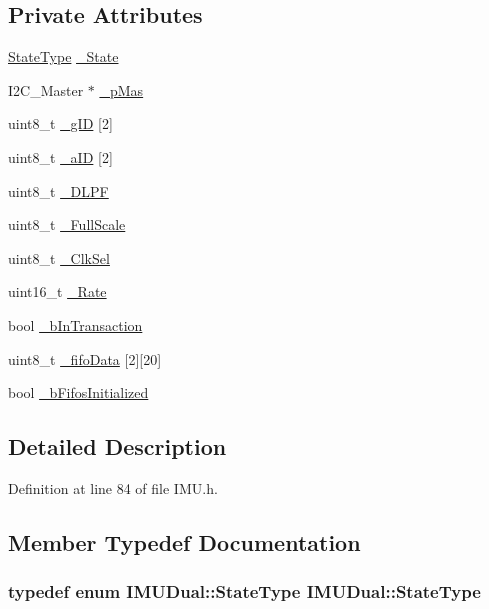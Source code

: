 \subsection*{Private Attributes}
\begin{DoxyCompactItemize}
\item 
\hyperlink{class_i_m_u_dual_a7378a5e321c03f3ef77e4f4f710f0130}{StateType} \hyperlink{class_i_m_u_dual_a6184224433fae8f33293b892f57cae3b}{\_\-State}
\item 
I2C\_\-Master $\ast$ \hyperlink{class_i_m_u_dual_a6e458f7bb91f9c057741019e42ae196d}{\_\-pMas}
\item 
uint8\_\-t \hyperlink{class_i_m_u_dual_a79c9ddf3a83582dbd9e9e4192361d3a4}{\_\-gID} \mbox{[}2\mbox{]}
\item 
uint8\_\-t \hyperlink{class_i_m_u_dual_a093961f13f8477da2ce6c9cdc16f1157}{\_\-aID} \mbox{[}2\mbox{]}
\item 
uint8\_\-t \hyperlink{class_i_m_u_dual_a7778bbcb689a8f8c2fdfbea9f1b6d79f}{\_\-DLPF}
\item 
uint8\_\-t \hyperlink{class_i_m_u_dual_a5d84d161adb012a2f92d50257fa6a74b}{\_\-FullScale}
\item 
uint8\_\-t \hyperlink{class_i_m_u_dual_a4ed556add0ea74046369ce6d8ba46023}{\_\-ClkSel}
\item 
uint16\_\-t \hyperlink{class_i_m_u_dual_af258a53def9b232203afc862c03a69af}{\_\-Rate}
\item 
bool \hyperlink{class_i_m_u_dual_ab1fe39075227813321890dfd4dd52335}{\_\-bInTransaction}
\item 
uint8\_\-t \hyperlink{class_i_m_u_dual_a9829db814da67788dd4250d95784c730}{\_\-fifoData} \mbox{[}2\mbox{]}\mbox{[}20\mbox{]}
\item 
bool \hyperlink{class_i_m_u_dual_ac66a95d57cefcdbe0acbde0f3678de70}{\_\-bFifosInitialized}
\end{DoxyCompactItemize}


\subsection{Detailed Description}


Definition at line 84 of file IMU.h.



\subsection{Member Typedef Documentation}
\hypertarget{class_i_m_u_dual_aab61cd505dbf9488df565a47e16575c2}{
\subsubsection[{StateType}]{\setlength{\rightskip}{0pt plus 5cm}typedef enum {\bf IMUDual::StateType}  {\bf IMUDual::StateType}}}
\label{class_i_m_u_dual_aab61cd505dbf9488df565a47e16575c2}


